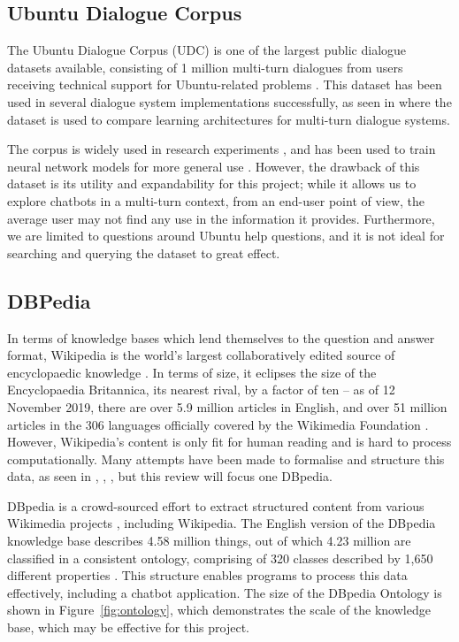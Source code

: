 \subsection{Ubuntu Dialogue Corpus}
The Ubuntu Dialogue Corpus (UDC) is one of the largest public dialogue datasets available, consisting of 1 million multi-turn dialogues from users receiving technical support for Ubuntu-related problems \cite{lowe2015ubuntu}. This dataset has been used in several dialogue system implementations successfully, as seen in \cite{lowe2015ubuntu} where the dataset is used to compare learning architectures for multi-turn dialogue systems. 


The corpus is widely used in research experiments \cite{kadlec2015improved}, and has been used to train neural network models for more general use \cite{lowe2017training}. However, the drawback of this dataset is its utility and expandability for this project; while it allows us to explore chatbots in a multi-turn context, from an end-user point of view, the average user may not find any use in the information it provides. Furthermore, we are limited to questions around Ubuntu help questions, and it is not ideal for searching and querying the dataset to great effect. 


\subsection{DBPedia}
In terms of knowledge bases which lend themselves to the question and answer format, Wikipedia is the world’s largest collaboratively edited source of encyclopaedic knowledge \cite{volkel2006semantic}. In terms of size, it eclipses the size of the Encyclopaedia Britannica, its nearest rival, by a factor of ten \cite{medelyan2009mining} -- as of 12 November 2019, there are over 5.9 million articles in English, and over 51 million articles in the 306 languages officially covered by the Wikimedia Foundation \cite{wikimedia2019}. However, Wikipedia’s content is only fit for human reading \cite{volkel2006semantic} and is hard to process computationally. Many attempts have been made to formalise and structure this data, as seen in \cite{volkel2006semantic}, \cite{medelyan2009mining}, \cite{wu2007autonomously}, but this review will focus one DBpedia.

DBpedia is a crowd-sourced effort to extract structured content from various Wikimedia projects \cite{dbpedia2019about}, including Wikipedia. The English version of the DBpedia knowledge base describes 4.58 million things, out of which 4.23 million are classified in a consistent ontology, comprising of 320 classes described by 1,650 different properties \cite{dbpedia2019ontology}. This structure enables programs to process this data effectively, including a chatbot application. The size of the DBpedia Ontology is shown in Figure~\ref{fig:ontology}, which demonstrates the scale of the knowledge base, which may be effective for this project.

